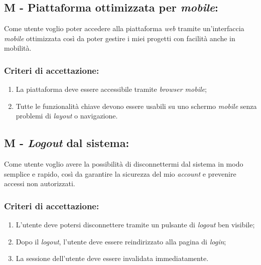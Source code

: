 \vspace{0.5cm}
\subsection*{M - Piattaforma ottimizzata per \textit{mobile}:}

\noindent Come utente voglio poter accedere alla piattaforma \textit{web} tramite un'interfaccia \textit{mobile} ottimizzata così da poter gestire i miei progetti con facilità anche in mobilità.

\subsubsection*{Criteri di accettazione:}

\begin{enumerate}
    \item La piattaforma deve essere accessibile tramite \textit{browser mobile};
    \item Tutte le funzionalità chiave devono essere usabili su uno schermo \textit{mobile} senza problemi di \textit{layout} o navigazione.
\end{enumerate}

\vspace{0.5cm}

\subsection*{M - \textit{Logout }dal sistema:}

\noindent Come utente voglio avere la possibilità di disconnettermi dal sistema in modo semplice e rapido, così da garantire la sicurezza del mio \textit{account} e prevenire accessi non autorizzati.

\subsubsection*{Criteri di accettazione:}

\begin{enumerate}
    \item L'utente deve potersi disconnettere tramite un pulsante di \textit{logout} ben visibile;
    \item Dopo il \textit{logout}, l'utente deve essere reindirizzato alla pagina di \textit{login};
    \item La sessione dell'utente deve essere invalidata immediatamente.
\end{enumerate}

